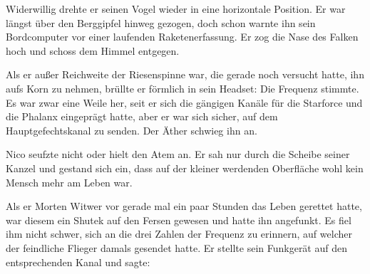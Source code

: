 \par

Widerwillig drehte er seinen Vogel wieder in eine horizontale Position. Er war längst über den Berggipfel hinweg gezogen, doch schon warnte ihn sein Bordcomputer vor einer laufenden Raketenerfassung. Er zog die Nase des Falken hoch und schoss dem Himmel entgegen.

\par

Als er außer Reichweite der Riesenspinne war, die gerade noch versucht hatte, ihn aufs Korn zu nehmen, brüllte er förmlich in sein Headset:  Die Frequenz stimmte. Es war zwar eine Weile her, seit er sich die gängigen Kanäle für die Starforce und die Phalanx eingeprägt hatte, aber er war sich sicher, auf dem Hauptgefechtskanal zu senden.  Der Äther schwieg ihn an. 

\par

Nico seufzte nicht oder hielt den Atem an. Er sah nur durch die Scheibe seiner Kanzel und gestand sich ein, dass auf der kleiner werdenden Oberfläche wohl kein Mensch mehr am Leben war.

\par

Als er Morten Witwer vor gerade mal ein paar Stunden das Leben gerettet hatte, war diesem ein Shutek auf den Fersen gewesen und hatte ihn angefunkt. Es fiel ihm nicht schwer, sich an die drei Zahlen der Frequenz zu erinnern, auf welcher der feindliche Flieger damals gesendet hatte. Er stellte sein Funkgerät auf den entsprechenden Kanal und sagte: 
